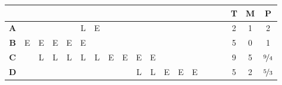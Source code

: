 \begin{ejercicio}
\begin{enumerate}
        \begin{table}[H]
            \begin{tabular}{ccccccccccccccccc|ccc}
                                            &                        &                       &                       &                       &                       &                        &                       &                       &                       &                       &                         &                       &                       &                       &                       &    & \textbf{T} & \textbf{M} & \textbf{P} \\ \hline
            \multicolumn{1}{c|}{\textbf{A}} &                        &                       &                       &                       & L                     & E                      &                       &                       &                       &                       &                         &                       &                       &                       &                       &    & 2          & 1          & 2          \\ \hline
            \multicolumn{1}{c|}{\textbf{B}} & E                      & E                     & E                     & E                     & E                     &                        &                       &                       &                       &                       &                         &                       &                       &                       &                       &    & 5          & 0          & 1          \\ \hline
            \multicolumn{1}{c|}{\textbf{C}} &                        & L                     & L                     & L                     & L                     & L                      & E                     & E                     & E                     & E                     &                         &                       &                       &                       &                       &    & 9          & 5          & $\nicefrac{9}{4}$        \\ \hline
            \multicolumn{1}{c|}{\textbf{D}} &                        &                       &                       &                       &                       &                        &                       &                       & L                     & L                     & E                       & E                     & E                     &                       &                       &    & 5          & 2          & $\nicefrac{5}{3}$        \\ \hline

\end{tabular}
\end{table}
\end{enumerate}
\end{ejercicio}
